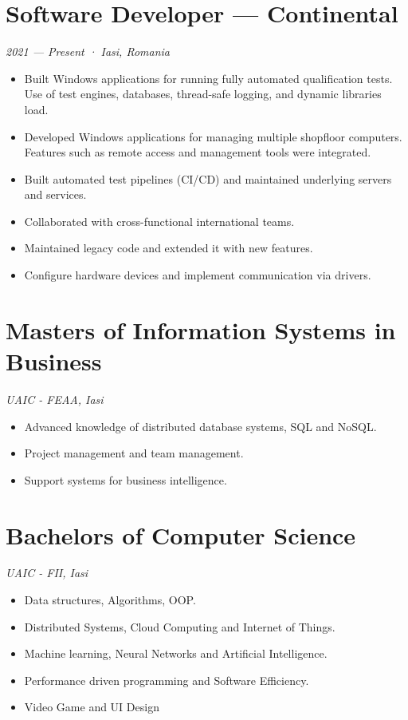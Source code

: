 \documentclass[a4paper,10pt]{article}
\begin{document}
\section*{Software Developer — Continental}
\textit{2021 — Present · Iasi, Romania} 
\begin{itemize}[leftmargin=*]
    \item Built Windows applications for running fully automated qualification tests. Use of test engines, databases, thread-safe logging, and dynamic libraries load.
    \item Developed Windows applications for managing multiple shopfloor computers. Features such as remote access and management tools were integrated.
    \item Built automated test pipelines (CI/CD) and maintained underlying servers and services.
    \item Collaborated with cross-functional international teams.
    \item Maintained legacy code and extended it with new features.
    \item Configure hardware devices and implement communication via drivers.
\end{itemize}

\section*{Masters of Information Systems in Business}
\textit{UAIC - FEAA, Iasi} 
\begin{itemize}[leftmargin=*]
    \item Advanced knowledge of distributed database systems, SQL and NoSQL.
    \item Project management and team management.
    \item Support systems for business intelligence.
\end{itemize}

\section*{Bachelors of Computer Science}
\textit{UAIC - FII, Iasi} 
\begin{itemize}[leftmargin=*]
    \item Data structures, Algorithms, OOP.
    \item Distributed Systems, Cloud Computing and Internet of Things.
    \item Machine learning, Neural Networks and Artificial Intelligence.
    \item Performance driven programming and Software Efficiency.
    \item Video Game and UI Design
\end{itemize}
\end{document}

